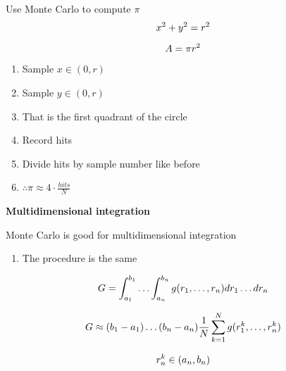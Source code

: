 \documentclass[aspectratio=1610,pdftex,dvipsnames,compress,xcolor={dvipsnames}]{beamer}
\begin{document}
\addtocounter{framenumber}{-1} 
\begin{frame}{Use Monte Carlo to compute $\pi$}
    \begin{equation}
        \LARGE
        x^2 + y^2 = r^2
    \end{equation}

    \begin{equation}
        \LARGE
        A = \pi r^2
    \end{equation}

    \vspace*{\fill}

    \begin{enumerate}[series=outerlist,topsep=0pt,itemsep=11pt,leftmargin=*,label=(\arabic*)]
        \item[]Sample $x \in (0,r)$
        \item[]Sample $y \in (0,r)$
        \item[]That is the first quadrant of the circle
        \item[]Record hits
        \item[]Divide hits by sample number like before
        \item[]\Large $\therefore \pi \approx 4 \cdot \frac{hits}{N}$
    \end{enumerate}
\end{frame}


\begin{frame}[plain]{}
    \centering\LARGE\textbf{Multidimensional integration}
\end{frame}


\addtocounter{framenumber}{-1} 
\begin{frame}{Monte Carlo is good for multidimensional integration}
    \begin{enumerate}[series=outerlist,topsep=0pt,itemsep=21pt,leftmargin=*,label=(\arabic*)]
        \item[]The procedure is the same
    \end{enumerate}

    \vspace*{\fill}

    \begin{equation}
        \LARGE
        G = \int_{a_1}^{b_1} \ldots \int_{a_n}^{b_n} g(r_1, \ldots ,r_n) dr_1 \ldots dr_n
    \end{equation}

    \begin{equation}
        \LARGE
        G \approx (b_1-a_1) \ldots (b_n-a_n) \frac{1}{N} \sum_{k=1}^N g(r_1^k, \ldots ,r_n^k)
    \end{equation}

    \begin{equation}
        \LARGE
        r_n^k \in (a_n,b_n)
    \end{equation}
\end{frame}
\end{document}
